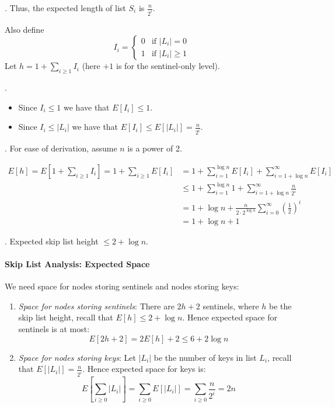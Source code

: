 \documentclass{article}
\begin{document}
\begin{result}[].
    Thus, the expected length of list $S_i$ is $\frac{n}{2^i}$.
\end{result}

Also define 
\[ I_i = \begin{cases}
    0 & \text{if } |L_i| = 0 \\ 
    1 & \text{if } |L_i| \geq 1 
\end{cases} \]
Let $h = 1 + \sum_{i \geq 1} I_i$ (here $+1$ is for the sentinel-only level).

\begin{discovery}[].
    \begin{itemize}
        \item Since $I_i \leq 1$ we have that $E[I_i] \leq 1$.
        \item Since $I_i \leq |L_i|$ we have that $\displaystyle E[I_i] \leq E[|L_i|] = \frac{n}{2^i}$.
    \end{itemize}
\end{discovery}

\begin{comm}[].
    For ease of derivation, assume $n$ is a power of 2.
\end{comm}
\begin{align*}
    E[h] = E\left[ 1 + \sum_{i \geq 1} I_i \right] = 1 + \sum_{i \geq 1} E[I_i] 
    & = 1 + \sum_{i=1}^{\log n} E[I_i] + \sum_{i=1+\log n}^\infty E[I_i] \\
    & \leq 1 + \sum_{i=1}^{\log n} 1 + \sum_{i=1+\log n}^\infty \frac{n}{2^i} \\
    & = 1 + \log n + \frac{n}{2 \cdot 2^{\log n}} \sum_{i=0}^\infty \left(\frac{1}{2}\right)^i \\ 
    & = 1 + \log n + 1
\end{align*}

\begin{result}[].
    Expected skip list height $\leq 2 + \log n$. 
\end{result}

\paragraph{Skip List Analysis: Expected Space} We need space for nodes storing sentinels and nodes storing keys:

\begin{enumerate}
    \item \textit{Space for nodes storing sentinels}: 
    There are $2h + 2$ sentinels, where $h$ be the skip list height, recall that $E[h] \leq 2 + \log n$. Hence expected space for sentinels is at most:
    \[ E[2h + 2] = 2E[h] + 2 \leq 6 + 2\log n \]

    \item \textit{Space for nodes storing keys}: Let $|L_i|$ be the number of keys in list $L_i$, recall that $E[|L_i|] = \frac{n}{2^i}$. Hence expected space for keys is:
    \[ E\left[\sum_{i \geq 0} |L_i|\right] = \sum_{i \geq 0} E[|L_i|] = \sum_{i \geq 0} \frac{n}{2^i} = 2n \]
\end{enumerate}
\end{document}
